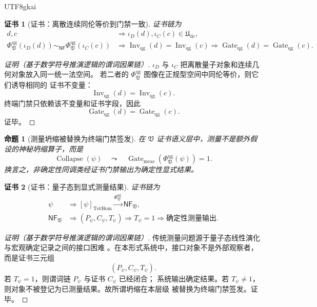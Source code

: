 \documentclass[12pt]{article}
\newtheorem{proposition}{命题}[section]
\newtheorem{Certificate}{证书}[section]
\newcommand{\Udc}{\mathfrak{U}_{\mathrm{dc}}}
\newcommand{\Vsys}{\mathfrak V}
\newcommand{\NF}{\mathsf{NF}}
\DeclareMathOperator{\Gate}{Gate}
\DeclareMathOperator{\Inv}{Inv}
\DeclareMathOperator{\TotHom}{TotHom}
\DeclareMathOperator{\Collapse}{Collapse}
\begin{document}
\begin{CJK*}{UTF8}{gkai}
\begin{Certificate}[证书：离散连续同伦等价到门禁一致]
\label{cert:tex59-qg-common-gate}
证书链为
\[
  \begin{aligned}
  d,c
  &\Longrightarrow
  \iota_D(d),\iota_C(c)\in\Udc,\\
  \Phi_{\Vsys}^{\mathrm{qg}}(\iota_D(d))
  \sim_{\NF}
  \Phi_{\Vsys}^{\mathrm{qg}}(\iota_C(c))
  &\Longrightarrow
  \Inv_{\mathrm{qg}}(d)=\Inv_{\mathrm{qg}}(c)
  \Longrightarrow
  \Gate_{\mathrm{qg}}(d)=\Gate_{\mathrm{qg}}(c).
  \end{aligned}
\]
\end{Certificate}

\begin{proof}[证明（基于数学符号推演逻辑的谓词因果链）]
\(\iota_D\) 与 \(\iota_C\) 把离散量子对象和连续几何对象放入同一统一法空间。
若二者的 \(\Phi_{\Vsys}^{\mathrm{qg}}\) 图像在正规型空间中同伦等价，则它们诱导相同的
证书不变量：
\[
  \Inv_{\mathrm{qg}}(d)=\Inv_{\mathrm{qg}}(c).
\]
终端门禁只依赖该不变量和证书字段，因此
\[
  \Gate_{\mathrm{qg}}(d)=\Gate_{\mathrm{qg}}(c).
\]
证毕。
\end{proof}

\begin{proposition}[测量坍缩被替换为终端门禁签发]
\label{prop:tex59-measurement-gate}
在 \(\Vsys\) 证书语义层中，测量不是额外假设的神秘坍缩算子，而是
\[
  \Collapse(\psi)
  \quad\leadsto\quad
  \Gate_{\mathrm{meas}}(\Phi_{\Vsys}^{\mathrm{qg}}(\psi))=1.
\]
换言之，非确定性同调类经证书门禁输出为确定性显式结果。
\end{proposition}

\begin{Certificate}[证书：量子态到显式测量结果]
\label{cert:tex59-measurement-gate}
证书链为
\[
  \begin{aligned}
  \psi
  &\Longrightarrow
  [\psi]_{\TotHom}
  \xrightarrow{\Phi_{\Vsys}^{\mathrm{qg}}}
  \NF_{\Vsys},\\
  \NF_{\Vsys}
  &\Longrightarrow
  (P_{\psi},C_{\psi},T_{\psi})
  \Longrightarrow
  T_{\psi}=1
  \Longrightarrow
  \text{确定性测量输出}.
  \end{aligned}
\]
\end{Certificate}

\begin{proof}[证明（基于数学符号推演逻辑的谓词因果链）]
传统测量问题源于量子态线性演化与宏观确定记录之间的接口困难
\cite{VonNeumann1955Quantum}。在本形式系统中，接口对象不是外部观察者，而是证书三元组
\[
  (P_{\psi},C_{\psi},T_{\psi}).
\]
若 \(T_{\psi}=1\)，则谓词链 \(P_{\psi}\) 与证书 \(C_{\psi}\) 已经闭合；
系统输出确定结果。若 \(T_{\psi}\ne1\)，则对象不被登记为已测量结果。故所谓坍缩在本层级
被替换为终端门禁签发。证毕。
\end{proof}


\end{CJK*}
\end{document}
